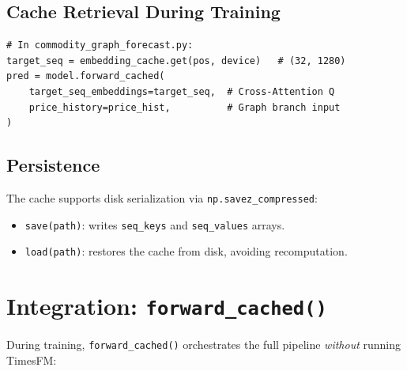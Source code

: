 \documentclass[11pt,a4paper]{article}
\begin{document}
\subsection{Cache Retrieval During Training}

\begin{lstlisting}
# In commodity_graph_forecast.py:
target_seq = embedding_cache.get(pos, device)   # (32, 1280)
pred = model.forward_cached(
    target_seq_embeddings=target_seq,  # Cross-Attention Q
    price_history=price_hist,          # Graph branch input
)
\end{lstlisting}

\subsection{Persistence}

The cache supports disk serialization via \texttt{np.savez\_compressed}:
\begin{itemize}[nosep]
    \item \texttt{save(path)}: writes \texttt{seq\_keys} and \texttt{seq\_values} arrays.
    \item \texttt{load(path)}: restores the cache from disk, avoiding recomputation.
\end{itemize}

\section{Integration: \texttt{forward\_cached()}}

During training, \texttt{forward\_cached()} orchestrates the full pipeline \emph{without} running TimesFM:
\end{document}
